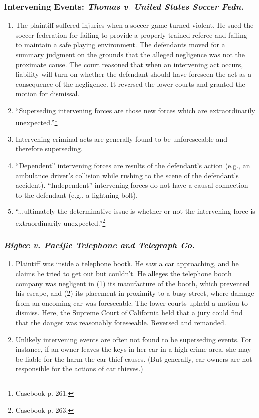 \subsubsection{Intervening Events: \emph{Thomas v. United States Soccer Fedn.}}

\begin{enumerate}
    \item The plaintiff suffered injuries when a soccer game turned violent. He sued the soccer federation for failing to provide a properly trained referee and failing to maintain a safe playing environment. The defendants moved for a summary judgment on the grounds that the alleged negligence was not the proximate cause. The court reasoned that when an intervening act occurs, liability will turn on whether the defendant should have foreseen the act as a consequence of the negligence. It reversed the lower courts and granted the motion for dismissal.
    \item ``Superseding intervening forces are those new forces which are extraordinarily unexpected.''\footnote{Casebook p. 261.}
    \item Intervening criminal acts are generally found to be unforeseeable and therefore superseding.
    \item ``Dependent'' intervening forces are results of the defendant's action (e.g., an ambulance driver's collision while rushing to the scene of the defendant's accident). ``Independent'' intervening forces do not have a causal connection to the defendant (e.g., a lightning bolt).
    \item ``...ultimately the determinative issue is whether or not the intervening force is extraordinarily unexpected.''\footnote{Casebook p. 263.}
\end{enumerate}

\subsubsection{\emph{Bigbee v. Pacific Telephone and Telegraph Co.}}

\begin{enumerate}
    \item Plaintiff was inside a telephone booth. He saw a car approaching, and he claims he tried to get out but couldn't. He alleges the telephone booth company was negligent in (1) its manufacture of the booth, which prevented his escape, and (2) its placement in proximity to a busy street, where damage from an oncoming car was foreseeable. The lower courts upheld a motion to dismiss. Here, the Supreme Court of California held that a jury could find that the danger was reasonably foreseeable. Reversed and remanded.
    \item Unlikely intervening events are often not found to be superseding events. For instance, if an owner leaves the keys in her car in a high crime area, she may be liable for the harm the car thief causes. (But generally, car owners are not responsible for the actions of car thieves.)
\end{enumerate}

